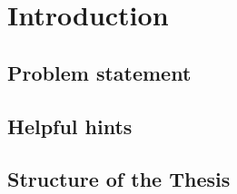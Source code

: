 \chapter{Introduction}
\label{chapter:intro}



\section{Problem statement}


\section{Helpful hints}

\section{Structure of the Thesis}
\label{section:structure} 

